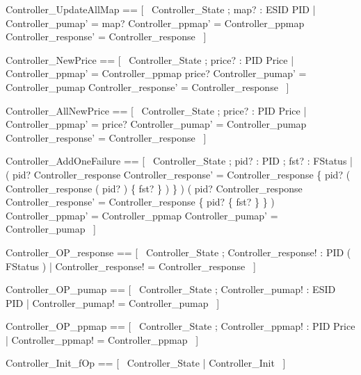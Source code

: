 \documentclass{article}
\begin{document}
\begin{zed}
	Controller\_UpdateAllMap == [~  \Delta Controller\_State ; map? : ESID \pfun PID | Controller\_pumap' = map? \land Controller\_ppmap' = Controller\_ppmap \land Controller\_response' = Controller\_response  ~]
\end{zed}

\begin{zed}
	Controller\_NewPrice == [~  \Delta Controller\_State ; price? : PID \pfun Price | Controller\_ppmap' = Controller\_ppmap \oplus price? \land Controller\_pumap' = Controller\_pumap \land Controller\_response' = Controller\_response  ~]
\end{zed}

\begin{zed}
	Controller\_AllNewPrice == [~  \Delta Controller\_State ; price? : PID \pfun Price | Controller\_ppmap' = price? \land Controller\_pumap' = Controller\_pumap \land Controller\_response' = Controller\_response  ~]
\end{zed}

\begin{zed}
	Controller\_AddOneFailure == [~  \Delta Controller\_State ; pid? : PID ; fst? : FStatus | ( pid? \in \dom Controller\_response \implies Controller\_response' = Controller\_response \oplus \{ pid? \mapsto ( Controller\_response ( pid? ) \cup \{ fst? \} ) \} ) \land ( pid? \notin \dom Controller\_response \implies Controller\_response' = Controller\_response \cup \{ pid? \mapsto \{ fst? \} \} ) \land Controller\_ppmap' = Controller\_ppmap \land Controller\_pumap' = Controller\_pumap  ~]
\end{zed}

\begin{zed}
	Controller\_OP\_response == [~  \Xi Controller\_State ; Controller\_response! : PID \pfun ( \power FStatus ) | Controller\_response! = Controller\_response  ~]
\end{zed}

\begin{zed}
	Controller\_OP\_pumap == [~  \Xi Controller\_State ; Controller\_pumap! : ESID \pfun PID | Controller\_pumap! = Controller\_pumap  ~]
\end{zed}

\begin{zed}
	Controller\_OP\_ppmap == [~  \Xi Controller\_State ; Controller\_ppmap! : PID \pfun Price | Controller\_ppmap! = Controller\_ppmap  ~]
\end{zed}

\begin{zed}
	Controller\_Init\_fOp == [~  \Xi Controller\_State | \lnot \pre Controller\_Init  ~]
\end{zed}
\end{document}
